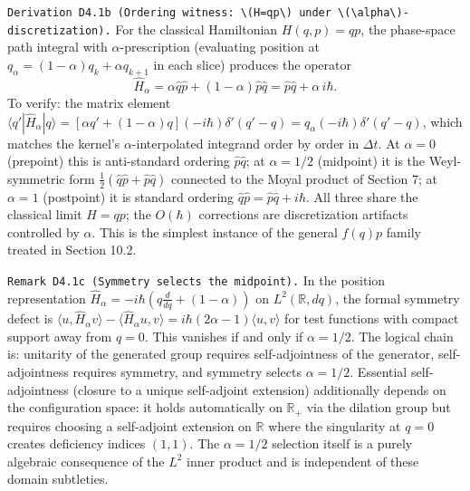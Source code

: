 \documentclass[
]{article}
\begin{document}
\texttt{Derivation\ D4.1b\ (Ordering\ witness:\ \textbackslash{}(H=qp\textbackslash{})\ under\ \textbackslash{}(\textbackslash{}alpha\textbackslash{})-discretization).}
For the classical Hamiltonian \(H(q,p)=qp\), the phase-space path
integral with \(\alpha\)-prescription (evaluating position at
\(q_\alpha=(1-\alpha)q_k+\alpha q_{k+1}\) in each slice) produces the
operator
\[\hat H_\alpha=\alpha\hat q\hat p + (1-\alpha)\hat p\hat q = \hat p\hat q + \alpha\,i\hbar.\]
To verify: the matrix element
\(\langle q'|\hat H_\alpha|q\rangle = [\alpha q'+(1-\alpha)q](-i\hbar)\delta'(q'-q) = q_\alpha(-i\hbar)\delta'(q'-q)\),
which matches the kernel's \(\alpha\)-interpolated integrand order by
order in \(\Delta t\). At \(\alpha=0\) (prepoint) this is anti-standard
ordering \(\hat p\hat q\); at \(\alpha=1/2\) (midpoint) it is the
Weyl-symmetric form \(\tfrac12(\hat q\hat p+\hat p\hat q)\) connected to
the Moyal product of Section 7; at \(\alpha=1\) (postpoint) it is
standard ordering \(\hat q\hat p=\hat p\hat q+i\hbar\). All three share
the classical limit \(H=qp\); the \(O(\hbar)\) corrections are
discretization artifacts controlled by \(\alpha\). This is the simplest
instance of the general \(f(q)p\) family treated in Section 10.2.

\texttt{Remark\ D4.1c\ (Symmetry\ selects\ the\ midpoint).} In the
position representation
\(\hat H_\alpha=-i\hbar(q\tfrac{d}{dq}+(1-\alpha))\) on
\(L^2(\mathbb R,dq)\), the formal symmetry defect is
\(\langle u,\hat H_\alpha v\rangle - \langle\hat H_\alpha u,v\rangle = i\hbar(2\alpha-1)\langle u,v\rangle\)
for test functions with compact support away from \(q=0\). This vanishes
if and only if \(\alpha=1/2\). The logical chain is: unitarity of the
generated group requires self-adjointness of the generator,
self-adjointness requires symmetry, and symmetry selects \(\alpha=1/2\).
Essential self-adjointness (closure to a unique self-adjoint extension)
additionally depends on the configuration space: it holds automatically
on \(\mathbb R_+\) via the dilation group but requires choosing a
self-adjoint extension on \(\mathbb R\) where the singularity at \(q=0\)
creates deficiency indices \((1,1)\). The \(\alpha=1/2\) selection
itself is a purely algebraic consequence of the \(L^2\) inner product
and is independent of these domain subtleties.
\end{document}
